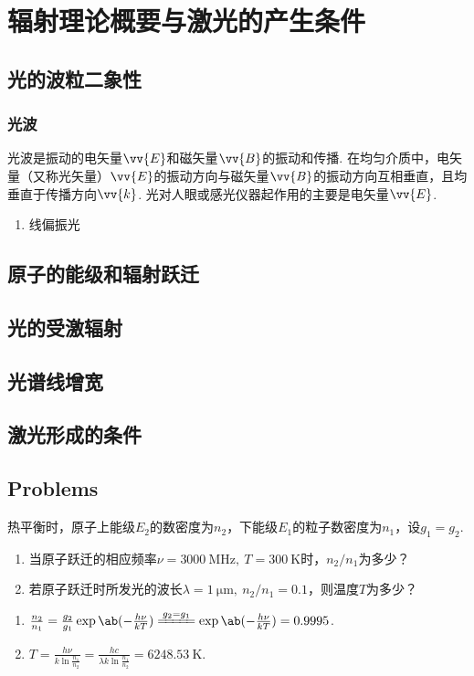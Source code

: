 \chapter{辐射理论概要与激光的产生条件}
\section{光的波粒二象性}
\subsection{光波}
光波是振动的电矢量$\vv{E}$和磁矢量$\vv{B}$的振动和传播. 在均匀介质中，电矢量（又称光矢量）$\vv{E}$的振动方向与磁矢量$\vv{B}$的振动方向互相垂直，且均垂直于传播方向$\vv{k}$. 光对人眼或感光仪器起作用的主要是电矢量$\vv{E}$.
\begin{enumerate}
	\item 线偏振光
\end{enumerate}
\section{原子的能级和辐射跃迁}
\section{光的受激辐射}
\section{光谱线增宽}
\section{激光形成的条件}
\newpage
\section*{Problems}
\begin{problem}
	热平衡时，原子上能级$E_2$的数密度为$n_2$，下能级$E_1$的粒子数密度为$n_1$，设$g_1=g_2$.
\begin{enumerate}
	\item 当原子跃迁的相应频率$\nu=\qty{3000}{\MHz},\ T=\qty{300}{\K}$时，$n_2/n_1$为多少？
	\item 若原子跃迁时所发光的波长$\lambda=\qty{1}{\um},\ n_2/n_1=0.1$，则温度$T$为多少？
\end{enumerate}
\end{problem}
\begin{solution}
\begin{enumerate}
	\item $\frac{n_2}{n_1}=\frac{g_2}{g_1}\exp\ab(-\frac{h\nu}{kT})\xlongequal{g_2=g_1}\exp\ab(-\frac{h\nu}{kT})=0.9995$.
	\item $T=\frac{h\nu}{k\ln\frac{n_1}{n_2}}=\frac{hc}{\lambda k\ln\frac{n_1}{n_2}}=\qty{6248.53}{\K}$.
\end{enumerate}
\end{solution}

